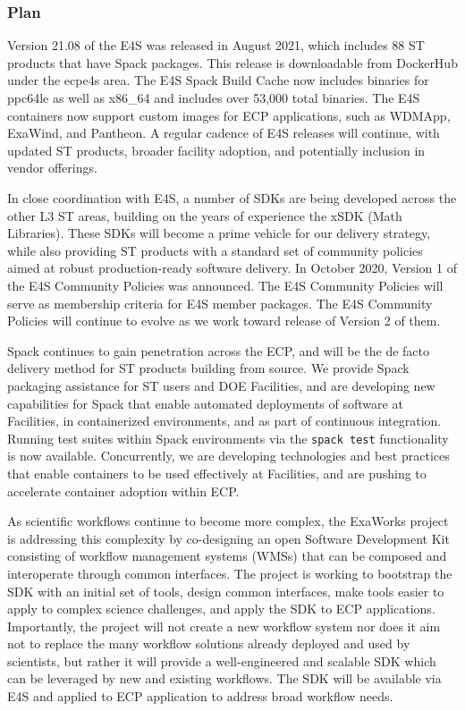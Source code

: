 \subsubsection{Plan}
Version 21.08 of the E4S was released in August 2021, which includes 88 ST products that have Spack packages. This release is downloadable from DockerHub under the ecpe4s area.  The E4S Spack Build Cache now includes binaries for ppc64le as well as x86\_64 and includes over 53,000 total binaries.  The E4S containers now support custom images for ECP applications, such as WDMApp, ExaWind, and Pantheon.  A regular cadence of E4S releases will continue, with updated ST products, broader facility adoption, and potentially inclusion in vendor offerings.

In close coordination with E4S, a number of SDKs are being developed across the other L3 ST areas, building on the years of experience the xSDK (Math Libraries).  These SDKs will become a prime vehicle for our delivery strategy, while also providing ST products with a standard set of community policies aimed at robust production-ready software delivery.  In October 2020, Version 1 of the E4S Community Policies was announced. The E4S Community Policies will serve as membership criteria for E4S member packages.  The E4S Community Policies will continue to evolve as we work toward release of Version 2 of them.

Spack continues to gain penetration across the ECP, and will be the de facto delivery method for ST products building from source. We provide Spack packaging assistance for ST users and DOE Facilities, and are developing new capabilities for Spack that enable automated deployments of software at Facilities, in containerized environments, and as part of continuous integration. Running test suites within Spack environments via the {\tt spack test} functionality is now available.  Concurrently, we are developing technologies and best practices that enable containers to be used effectively at Facilities, and are pushing to accelerate container adoption within ECP.  

As scientific workflows continue to become more complex, the ExaWorks project is addressing this complexity by co-designing an open Software Development Kit consisting of workflow management systems (WMSs) that can be composed and interoperate through common interfaces.  The project is working to bootstrap the SDK with an initial set of tools, design common interfaces, make tools easier to apply to complex science challenges, and apply the SDK to ECP applications.  Importantly, the project will not create a new workflow system nor does it aim not to replace the many workflow solutions already deployed and used by scientists, but rather it will provide a well-engineered and scalable SDK which can be leveraged by new and existing workflows.  The SDK will be available via E4S and applied to ECP application to address broad workflow needs.

